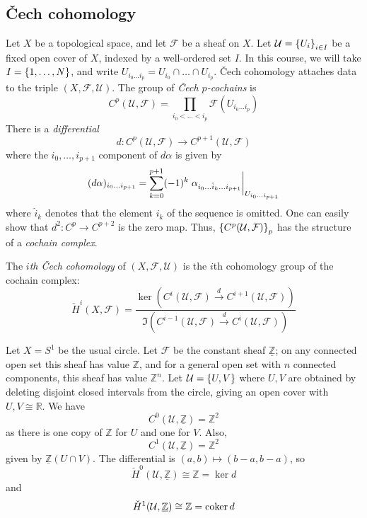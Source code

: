 \subsection{\v{C}ech cohomology}
Let \( X \) be a topological space, and let \( \mathcal F \) be a sheaf on \( X \).
Let \( \mathcal U = \qty{U_i}_{i \in I} \) be a fixed open cover of \( X \), indexed by a well-ordered set \( I \).
In this course, we will take \( I = \qty{1, \dots, N} \), and write \( U_{i_0 \dots i_p} = U_{i_0} \cap \dots \cap U_{i_p} \).
\v{C}ech cohomology attaches data to the triple \( (X, \mathcal F, \mathcal U) \).
The group of \emph{\v{C}ech \( p \)-cochains} is
\[ C^p(\mathcal U, \mathcal F) = \prod_{i_0 < \dots < i_p} \mathcal F(U_{i_0 \dots i_p}) \]
There is a \emph{differential}
\[ d : C^p(\mathcal U, \mathcal F) \to C^{p+1}(\mathcal U, \mathcal F) \]
where the \( i_0, \dots, i_{p+1} \) component of \( d\alpha \) is given by
\[ (d\alpha)_{i_0 \dots i_{p+1}} = \sum_{k=0}^{p+1} (-1)^k \eval{\alpha_{i_0\dots \hat i_k \dots i_{p+1}}}_{U_{i_0 \dots i_{p+1}}} \]
where \( \hat i_k \) denotes that the element \( i_k \) of the sequence is omitted.
One can easily show that \( d^2 : C^p \to C^{p+2} \) is the zero map.
Thus, \( \qty{C^p(\mathcal U, \mathcal F)}_p \) has the structure of a \emph{cochain complex}.
\begin{definition}
	The \emph{\( i \)th \v{C}ech cohomology} of \( (X, \mathcal F, \mathcal U) \) is the \( i \)th cohomology group of the cochain complex:
	\[ \check{H}^i(X, \mathcal F) = \frac{\ker(C^i(\mathcal U, \mathcal F) \xrightarrow d C^{i+1}(\mathcal U, \mathcal F))}{\Im(C^{i-1}(\mathcal U, \mathcal F) \xrightarrow d C^i(\mathcal U, \mathcal F))} \]
\end{definition}
\begin{example}
	Let \( X = S^1 \) be the usual circle.
	Let \( \mathcal F \) be the constant sheaf \( \underline{\mathbb Z} \); on any connected open set this sheaf has value \( \mathbb Z \), and for a general open set with \( n \) connected components, this sheaf has value \( \mathbb Z^n \).
	Let \( \mathcal U = \qty{U, V} \) where \( U, V \) are obtained by deleting disjoint closed intervals from the circle, giving an open cover with \( U, V \cong \mathbb R \).
	We have
	\[ C^0(\mathcal U, \underline{\mathbb Z}) = \mathbb Z^2 \]
	as there is one copy of \( \mathbb Z \) for \( U \) and one for \( V \).
	Also,
	\[ C^1(\mathcal U, \underline{\mathbb Z}) = \mathbb Z^2 \]
	given by \( \underline{\mathbb Z}(U \cap V) \).
	The differential is \( (a, b) \mapsto (b-a, b-a) \), so
	\[ \check{H}^0(\mathcal U, \underline{\mathbb Z}) \cong \mathbb Z = \ker d \]
	and
	\[ \check{H}^1(\mathcal U, \underline{\mathbb Z}) \cong \mathbb Z = \operatorname{coker} d \]
\end{example}
